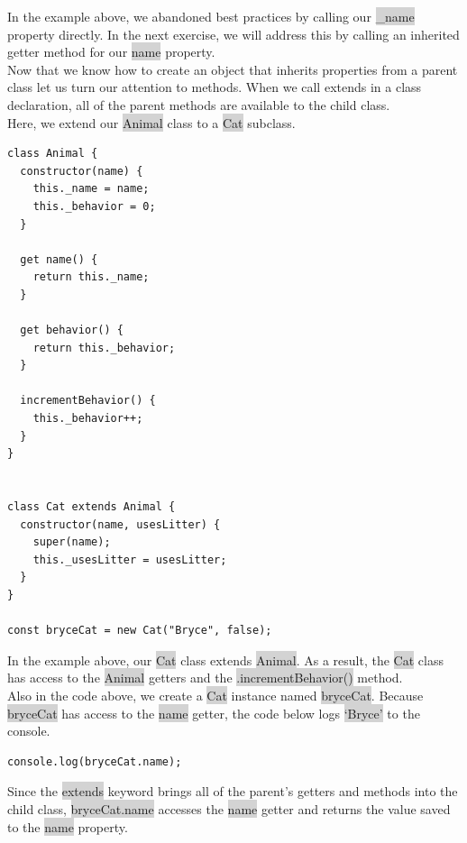 \documentclass[11pt]{article}
\begin{document}
In the example above, we abandoned best practices by calling our \colorbox{lightgray}{\_name} property directly. In the next exercise, we will address this by calling an inherited getter method for our \colorbox{lightgray}{name} property. \\
\newline
Now that we know how to create an object that inherits properties from a parent class let us turn our attention to methods. When we call extends in a class declaration, all of the parent methods are available to the child class. \\
\newline
Here, we extend our \colorbox{lightgray}{Animal} class to a \colorbox{lightgray}{Cat} subclass.
\newpage
\begin{lstlisting}
class Animal {
  constructor(name) {
    this._name = name;
    this._behavior = 0;
  }

  get name() {
    return this._name;
  }

  get behavior() {
    return this._behavior;
  }

  incrementBehavior() {
    this._behavior++;
  }
} 


class Cat extends Animal {
  constructor(name, usesLitter) {
    super(name);
    this._usesLitter = usesLitter;
  }
}

const bryceCat = new Cat("Bryce", false);
\end{lstlisting}
In the example above, our \colorbox{lightgray}{Cat} class extends \colorbox{lightgray}{Animal}. As a result, the \colorbox{lightgray}{Cat} class has access to the \colorbox{lightgray}{Animal} getters and the \colorbox{lightgray}{.incrementBehavior()} method. \\
\newline
Also in the code above, we create a \colorbox{lightgray}{Cat} instance named \colorbox{lightgray}{bryceCat}. Because \colorbox{lightgray}{bryceCat} has access to the \colorbox{lightgray}{name} getter, the code below logs \colorbox{lightgray}{`Bryce'} to the console. 
\begin{lstlisting}
console.log(bryceCat.name);
\end{lstlisting}
Since the \colorbox{lightgray}{extends} keyword brings all of the parent’s getters and methods into the child class, \colorbox{lightgray}{bryceCat.name} accesses the \colorbox{lightgray}{name} getter and returns the value saved to the \colorbox{lightgray}{name} property. \\
\newline
\end{document}
